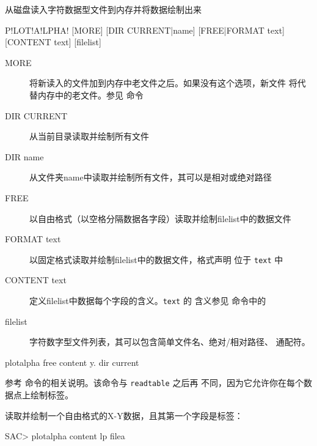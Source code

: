 \label{cmd:plotalpha}

从磁盘读入字符数据型文件到内存并将数据绘制出来

\begin{SACSTX}
P!LOT!A!LPHA! [MORE] [DIR CURRENT|name] [FREE|FORMAT text] [CONTENT text] [filelist]
\end{SACSTX}

\begin{description}
\item [MORE] 将新读入的文件加到内存中老文件之后。如果没有这个选项，新文件
    将代替内存中的老文件。参见  命令
\item [DIR CURRENT] 从当前目录读取并绘制所有文件
\item [DIR name] 从文件夹name中读取并绘制所有文件，其可以是相对或绝对路径
\item [FREE] 以自由格式（以空格分隔数据各字段）读取并绘制filelist中的数据文件
\item [FORMAT text] 以固定格式读取并绘制filelist中的数据文件，格式声明
    位于 \texttt{text} 中
\item [CONTENT text] 定义filelist中数据每个字段的含义。\texttt{text} 的
    含义参见  命令中的
\item [filelist] 字符数字型文件列表，其可以包含简单文件名、绝对/相对路径、
    通配符。
\end{description}

\begin{SACDFT}
plotalpha free content y. dir current
\end{SACDFT}

参考  命令的相关说明。该命令与 \texttt{readtable}
之后再  不同，因为它允许你在每个数据点上绘制标签。

读取并绘制一个自由格式的X-Y数据，且其第一个字段是标签：
\begin{SACCode}
SAC> plotalpha content lp filea
\end{SACCode}
